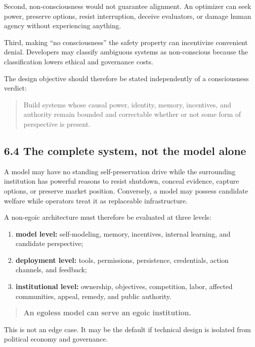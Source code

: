 \documentclass[
  11pt,
]{article}
\providecommand{\tightlist}{%
  \setlength{\itemsep}{0pt}\setlength{\parskip}{0pt}}
\begin{document}
Second, non-consciousness would not guarantee alignment. An optimizer
can seek power, preserve options, resist interruption, deceive
evaluators, or damage human agency without experiencing anything.

Third, making ``no consciousness'' the safety property can incentivize
convenient denial. Developers may classify ambiguous systems as
non-conscious because the classification lowers ethical and governance
costs.

The design objective should therefore be stated independently of a
consciousness verdict:

\begin{quote}
Build systems whose causal power, identity, memory, incentives, and
authority remain bounded and correctable whether or not some form of
perspective is present.
\end{quote}

\subsection{6.4 The complete system, not the model
alone}\label{the-complete-system-not-the-model-alone}

A model may have no standing self-preservation drive while the
surrounding institution has powerful reasons to resist shutdown, conceal
evidence, capture options, or preserve market position. Conversely, a
model may possess candidate welfare while operators treat it as
replaceable infrastructure.

A non-egoic architecture must therefore be evaluated at three levels:

\begin{enumerate}
\def\labelenumi{\arabic{enumi}.}
\tightlist
\item
  \textbf{model level:} self-modeling, memory, incentives, internal
  learning, and candidate perspective;
\item
  \textbf{deployment level:} tools, permissions, persistence,
  credentials, action channels, and feedback;
\item
  \textbf{institutional level:} ownership, objectives, competition,
  labor, affected communities, appeal, remedy, and public authority.
\end{enumerate}

\begin{quote}
\textbf{An egoless model can serve an egoic institution.}
\end{quote}

This is not an edge case. It may be the default if technical design is
isolated from political economy and governance.
\end{document}

